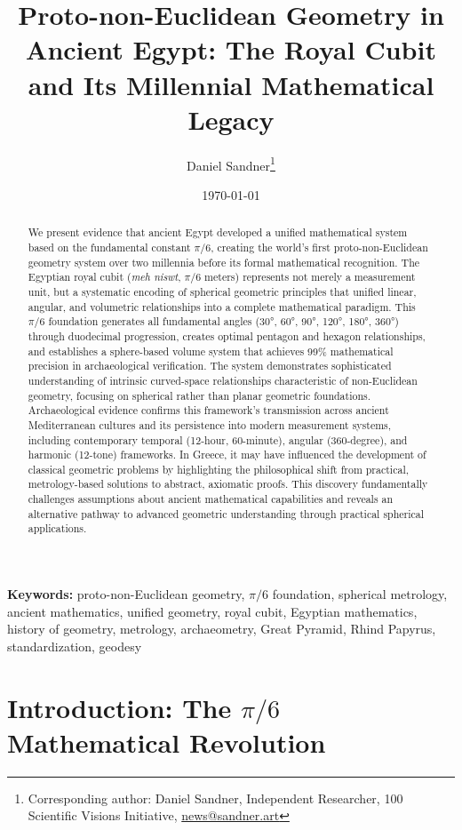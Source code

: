 \documentclass[11pt]{article}
\title{Proto-non-Euclidean Geometry in Ancient Egypt: The Royal Cubit and Its Millennial Mathematical Legacy}
\author{{Daniel Sandner}\thanks{Corresponding author: Daniel Sandner, Independent Researcher, 100 Scientific Visions Initiative, \href{news@sandner.art}{news@sandner.art}}} %
\date{\today}
\begin{document}
\maketitle

\begin{abstract}
We present evidence that ancient Egypt developed a unified mathematical system based on the fundamental constant $\pi/6$, creating the world's first proto-non-Euclidean geometry system over two millennia before its formal mathematical recognition. The Egyptian royal cubit (\textit{meh niswt}, $\pi/6$ meters) represents not merely a measurement unit, but a systematic encoding of spherical geometric principles that unified linear, angular, and volumetric relationships into a complete mathematical paradigm. This $\pi/6$ foundation generates all fundamental angles (30°, 60°, 90°, 120°, 180°, 360°) through duodecimal progression, creates optimal pentagon and hexagon relationships, and establishes a sphere-based volume system that achieves 99\% mathematical precision in archaeological verification. The system demonstrates sophisticated understanding of intrinsic curved-space relationships characteristic of non-Euclidean geometry, focusing on spherical rather than planar geometric foundations. Archaeological evidence confirms this framework's transmission across ancient Mediterranean cultures and its persistence into modern measurement systems, including contemporary temporal (12-hour, 60-minute), angular (360-degree), and harmonic (12-tone) frameworks. In Greece, it may have influenced the development of classical geometric problems by highlighting the philosophical shift from practical, metrology-based solutions to abstract, axiomatic proofs. This discovery fundamentally challenges assumptions about ancient mathematical capabilities and reveals an alternative pathway to advanced geometric understanding through practical spherical applications.
\end{abstract}

\noindent\textbf{Keywords:} proto-non-Euclidean geometry, $\pi/6$ foundation, spherical metrology, ancient mathematics, unified geometry, royal cubit, Egyptian mathematics, history of geometry, metrology, archaeometry, Great Pyramid, Rhind Papyrus, standardization, geodesy

\section{Introduction: The \texorpdfstring{$\pi/6$}{pi/6} Mathematical Revolution}
\end{document}
